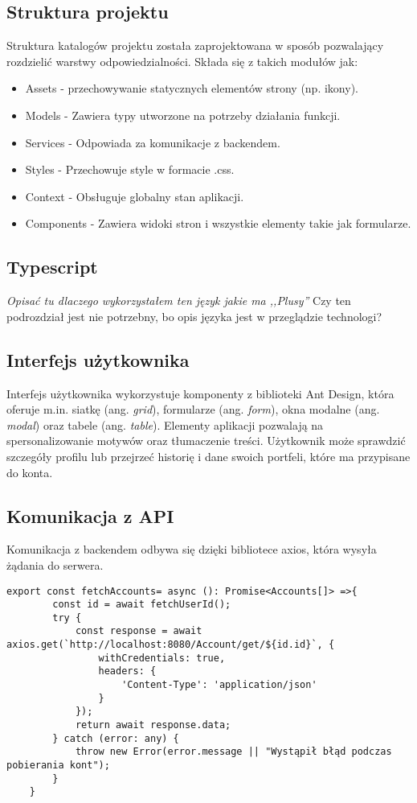 \subsection*{Struktura projektu}
Struktura katalogów projektu została zaprojektowana w sposób pozwalający rozdzielić warstwy odpowiedzialności. Składa się z takich modułów jak:
\begin{itemize}
	\item Assets - przechowywanie statycznych elementów strony (np. ikony).
	\item Models - Zawiera typy utworzone na potrzeby działania funkcji.
	\item Services - Odpowiada za komunikacje z backendem.
	\item Styles - Przechowuje style w formacie .css.
	\item Context - Obsługuje globalny stan aplikacji.
	\item Components - Zawiera widoki stron i wszystkie elementy takie jak formularze.
\end{itemize}
\subsection*{Typescript}
\textit{Opisać tu dlaczego wykorzystałem ten język jakie ma ,,Plusy''}
Czy ten podrozdział jest nie potrzebny, bo opis języka jest w przeglądzie technologi? 
\subsection*{Interfejs użytkownika}
Interfejs użytkownika wykorzystuje komponenty z biblioteki Ant Design, która oferuje m.in. siatkę (ang. \textit{grid}), formularze (ang. \textit{form}), okna modalne (ang. \textit{modal}) oraz tabele (ang. \textit{table}). Elementy aplikacji pozwalają na spersonalizowanie motywów oraz tłumaczenie treści. Użytkownik może sprawdzić szczegóły profilu lub przejrzeć historię i dane swoich portfeli, które ma przypisane do konta.
\subsection*{Komunikacja z API}
Komunikacja z backendem odbywa się dzięki bibliotece axios, która wysyła żądania do serwera. 
\begin{lstlisting}[caption={Funkcja wyszukująca wszystkie konta użytkownika}, label={lst:TS-service1}]
	export const fetchAccounts= async (): Promise<Accounts[]> =>{
		const id = await fetchUserId();
		try {
			const response = await axios.get(`http://localhost:8080/Account/get/${id.id}`, {
				withCredentials: true,
				headers: {
					'Content-Type': 'application/json'
				}
			});
			return await response.data;
		} catch (error: any) {
			throw new Error(error.message || "Wystąpił błąd podczas pobierania kont");
		}
	}
\end{lstlisting}

